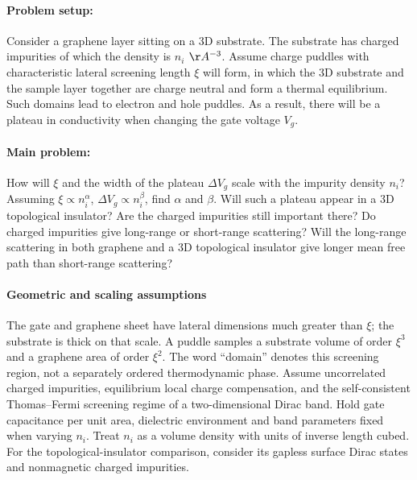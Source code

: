 \documentclass[11pt]{article}
\begin{document}
\paragraph*{Problem setup:}
Consider a graphene layer sitting on a 3D substrate. The substrate has charged impurities of which the density is $n_i$ $\AA^{-3}$. Assume charge puddles with characteristic lateral screening length $\xi$ will form,  in which the 3D substrate and the sample layer together are charge neutral and form a thermal equilibrium. Such domains lead to electron and hole puddles. As a result, there will be a plateau in conductivity when changing the gate voltage $V_g$.

\paragraph*{Main problem:}

How will $\xi$ and the width of the plateau $\Delta V_g$ scale with the impurity density $n_i$?  Assuming $\xi\propto n_i^{\alpha}$, $\Delta V_g\propto n_i^{\beta}$, find $\alpha$ and $\beta$. Will such a plateau appear in a 3D topological insulator? Are the charged impurities still important there? Do charged impurities give long-range or short-range scattering? Will the long-range scattering in both graphene and a 3D topological insulator give longer mean free path than short-range scattering?



\paragraph*{Geometric and scaling assumptions}
The gate and graphene sheet have lateral dimensions much greater than $\xi$;
the substrate is thick on that scale. A puddle samples a substrate volume of
order $\xi^3$ and a graphene area of order $\xi^2$. The word ``domain'' denotes
this screening region, not a separately ordered thermodynamic phase.
Assume uncorrelated charged impurities, equilibrium local charge compensation,
and the self-consistent Thomas--Fermi screening regime of a two-dimensional
Dirac band. Hold gate capacitance per unit area, dielectric environment and
band parameters fixed when varying $n_i$. Treat $n_i$ as a volume density with
units of inverse length cubed. For the topological-insulator comparison,
consider its gapless surface Dirac states and nonmagnetic charged impurities.
\end{document}

